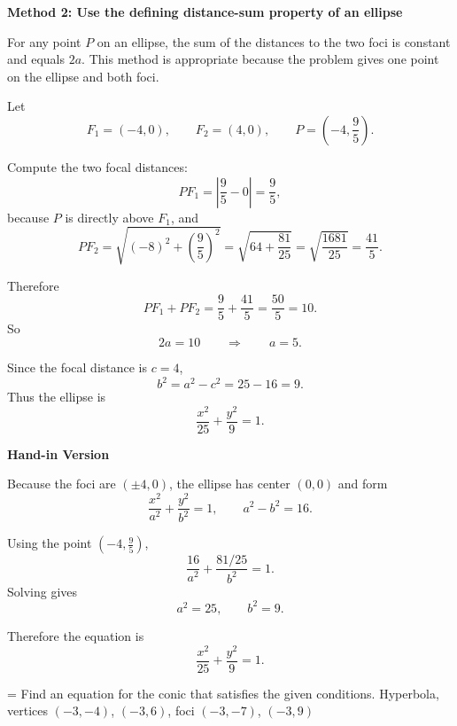 \documentclass[a4paper,12pt,twocolumn]{article}
\newlength{\problemnumberwidth}
\newenvironment{solutionbox}{\begin{framed}}{\end{framed}}
\newcommand{\problem}[3]{%
  \Needspace{10\baselineskip}%
  \phantomsection\label{#1}%
  \par\vspace{0.8em}%
  \noindent
  \hangindent=\problemnumberwidth
  \hangafter=1
  \makebox[\problemnumberwidth][l]{\textbf{#2.}}#3\par
}
\begin{document}
\begin{solutionbox}
\textbf{Method 2: Use the defining distance-sum property of an ellipse}

\begin{steps}
\item For any point \(P\) on an ellipse, the sum of the distances to the two foci is constant and equals \(2a\). This method is appropriate because the problem gives one point on the ellipse and both foci.

Let
\[
F_1=(-4,0),\qquad F_2=(4,0),\qquad P=\left(-4,\frac95\right).
\]

\item Compute the two focal distances:
\[
PF_1=\left|\frac95-0\right|=\frac95,
\]
because \(P\) is directly above \(F_1\), and
\[
PF_2=\sqrt{(-8)^2+\left(\frac95\right)^2}
=\sqrt{64+\frac{81}{25}}
=\sqrt{\frac{1681}{25}}
=\frac{41}{5}.
\]

\item Therefore
\[
PF_1+PF_2=\frac95+\frac{41}{5}=\frac{50}{5}=10.
\]
So
\[
2a=10 \qquad\Longrightarrow\qquad a=5.
\]

\item Since the focal distance is \(c=4\),
\[
b^2=a^2-c^2=25-16=9.
\]
Thus the ellipse is
\[
\boxed{\frac{x^2}{25}+\frac{y^2}{9}=1.}
\]
\end{steps}
\end{solutionbox}

\begin{solutionbox}
\textbf{Hand-in Version}

Because the foci are \((\pm4,0)\), the ellipse has center \((0,0)\) and form
\[
\frac{x^2}{a^2}+\frac{y^2}{b^2}=1,
\qquad a^2-b^2=16.
\]

Using the point \(\left(-4,\frac95\right)\),
\[
\frac{16}{a^2}+\frac{81/25}{b^2}=1.
\]
Solving gives
\[
a^2=25,\qquad b^2=9.
\]

Therefore the equation is
\[
\boxed{\frac{x^2}{25}+\frac{y^2}{9}=1.}
\]
\end{solutionbox}

\problem{prob:10-5-47}{47}{Find an equation for the conic that satisfies the given conditions.
\medskip
\noindent Hyperbola, vertices \((-3,-4)\), \((-3,6)\), foci \((-3,-7)\), \((-3,9)\)}
\end{document}
